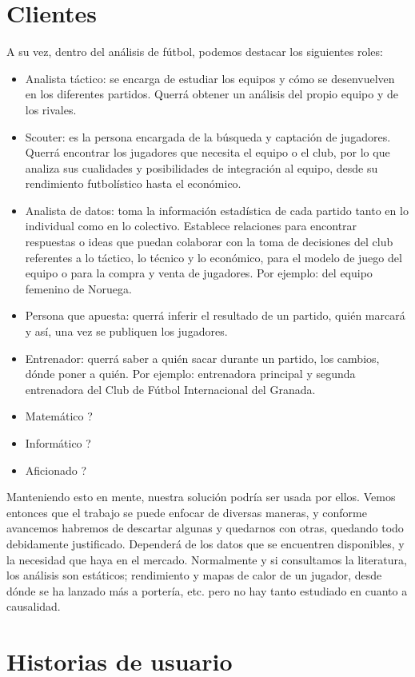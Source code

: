 \section{Clientes}
A su vez, dentro del análisis de fútbol, podemos destacar los siguientes roles:

\begin{itemize}
    \item Analista táctico: se encarga de estudiar los equipos y cómo 
    se desenvuelven en los diferentes partidos. Querrá obtener un análisis 
    del propio equipo y de los rivales.
    \item Scouter: es la persona encargada de la búsqueda y captación 
    de jugadores. Querrá encontrar los jugadores que necesita el equipo 
    o el club, por lo que analiza sus cualidades y posibilidades de 
    integración al equipo, desde su rendimiento futbolístico hasta el 
    económico.
    \item Analista de datos: toma la información estadística de 
    cada partido tanto en lo individual como en lo colectivo. 
    Establece relaciones para encontrar respuestas o ideas que 
    puedan colaborar con la toma de decisiones del club referentes 
    a lo táctico, lo técnico y lo económico, para el modelo de 
    juego del equipo o para la compra y venta de jugadores. Por ejemplo: del 
    equipo femenino de Noruega. 
    \item Persona que apuesta: querrá inferir el resultado de un partido, 
    quién marcará y así, una vez se publiquen los jugadores. 
    \item Entrenador: querrá saber a quién sacar durante un partido, los 
    cambios, dónde poner a quién. Por ejemplo: entrenadora principal y 
    segunda entrenadora del Club de Fútbol Internacional del Granada.
    \item Matemático ?
    \item Informático ?
    \item Aficionado  ?
\end{itemize}

Manteniendo esto en mente, nuestra solución 
podría ser usada por ellos. Vemos entonces 
que el trabajo se puede enfocar de diversas 
maneras, y conforme avancemos habremos de descartar algunas y 
quedarnos con otras, quedando todo debidamente justificado. Dependerá de los 
datos que se encuentren disponibles, y la necesidad que haya en el mercado. 
Normalmente y si consultamos la literatura, los análisis son estáticos; 
rendimiento y mapas de calor de un jugador, desde dónde se ha lanzado más 
a portería, etc. pero no hay tanto estudiado en cuanto a causalidad.


\section{Historias de usuario}  


